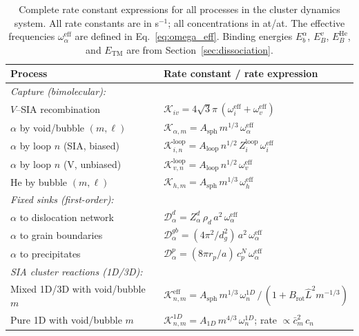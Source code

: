 \begin{table}[htbp]
\centering
\caption{Complete rate constant expressions for all processes in the cluster
dynamics system. All rate constants are in s$^{-1}$; all concentrations in
at/at. The effective frequencies $\omega_\alpha^{\mathrm{eff}}$ are defined in
Eq.~\eqref{eq:omega_eff}. Binding energies $E_b^\alpha$, $E_B^v$,
$E_B^{\mathrm{He}}$, and $E_{\mathrm{TM}}$ are from
Section~\ref{sec:dissociation}.}
\label{tab:rate_summary_params}
\renewcommand{\arraystretch}{1.3}
\begin{tabular}{@{}p{3.8cm}l@{}}
\toprule
\textbf{Process} & \textbf{Rate constant / rate expression} \\
\midrule
\multicolumn{2}{l}{\emph{Capture (bimolecular):}} \\
$V$--SIA recombination
  & $\mathcal{K}_{iv} = 4\sqrt{3}\pi\,(\omega_i^{\mathrm{eff}} + \omega_v^{\mathrm{eff}})$ \\
$\alpha$ by void/bubble $(m,\ell)$
  & $\mathcal{K}_{\alpha,m} = A_{\mathrm{sph}}\,m^{1/3}\,\omega_\alpha^{\mathrm{eff}}$ \\
$\alpha$ by loop $n$ (SIA, biased)
  & $\mathcal{K}_{i,n}^{\mathrm{loop}} = A_{\mathrm{loop}}\,n^{1/2}\,Z_i^{\mathrm{loop}}\,\omega_i^{\mathrm{eff}}$ \\
$\alpha$ by loop $n$ (V, unbiased)
  & $\mathcal{K}_{v,n}^{\mathrm{loop}} = A_{\mathrm{loop}}\,n^{1/2}\,\omega_v^{\mathrm{eff}}$ \\
He by bubble $(m,\ell)$
  & $\mathcal{K}_{h,m} = A_{\mathrm{sph}}\,m^{1/3}\,\omega_h^{\mathrm{eff}}$ \\[3pt]

\multicolumn{2}{l}{\emph{Fixed sinks (first-order):}} \\
$\alpha$ to dislocation network
  & $\mathcal{D}_\alpha^d = Z_\alpha^d\,\rho_d\,a^2\,\omega_\alpha^{\mathrm{eff}}$ \\
$\alpha$ to grain boundaries
  & $\mathcal{D}_\alpha^{gb} = (4\pi^2/d_g^2)\,a^2\,\omega_\alpha^{\mathrm{eff}}$ \\
$\alpha$ to precipitates
  & $\mathcal{D}_\alpha^p = (8\pi r_p/a)\,c_p^N\,\omega_\alpha^{\mathrm{eff}}$ \\[3pt]

\multicolumn{2}{l}{\emph{SIA cluster reactions (1D/3D):}} \\
Mixed 1D/3D with void/bubble $m$
  & $\mathcal{K}_{n,m}^{\mathrm{eff}} = A_{\mathrm{sph}}\,m^{1/3}\,\omega_n^{1D}\,\big/\,
    (1 + B_{\mathrm{rot}}\hat{L}^2 m^{-1/3})$ \\
Pure 1D with void/bubble $m$
  & $\mathcal{K}_{n,m}^{1D} = A_{1D}\,m^{4/3}\,\omega_n^{1D}$;
    \; rate $\propto \bar{c}_m^2\,c_n$ \\[3pt]


\end{tabular}
\end{table}
